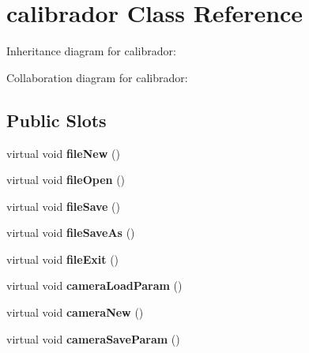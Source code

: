 \hypertarget{classcalibrador}{}\section{calibrador Class Reference}
\label{classcalibrador}


Inheritance diagram for calibrador\+:


Collaboration diagram for calibrador\+:
\subsection*{Public Slots}
\begin{DoxyCompactItemize}
\item 
virtual void {\bfseries file\+New} ()\hypertarget{classcalibrador_acc61eac7bc3b9f12d98f72a5f029d8b8}{}\label{classcalibrador_acc61eac7bc3b9f12d98f72a5f029d8b8}

\item 
virtual void {\bfseries file\+Open} ()\hypertarget{classcalibrador_a69fa0dd808698792a75f7294f2109c18}{}\label{classcalibrador_a69fa0dd808698792a75f7294f2109c18}

\item 
virtual void {\bfseries file\+Save} ()\hypertarget{classcalibrador_a9a625add9f1fe1314fa4fead802a69d5}{}\label{classcalibrador_a9a625add9f1fe1314fa4fead802a69d5}

\item 
virtual void {\bfseries file\+Save\+As} ()\hypertarget{classcalibrador_aed2fe336e0cff3d03bf0716c8e2b655c}{}\label{classcalibrador_aed2fe336e0cff3d03bf0716c8e2b655c}

\item 
virtual void {\bfseries file\+Exit} ()\hypertarget{classcalibrador_a99e69e2a5ceeb0aee5d4bcf1855b7fdf}{}\label{classcalibrador_a99e69e2a5ceeb0aee5d4bcf1855b7fdf}

\item 
virtual void {\bfseries camera\+Load\+Param} ()\hypertarget{classcalibrador_add25061e8da4c8492ed7ffa6fe63c312}{}\label{classcalibrador_add25061e8da4c8492ed7ffa6fe63c312}

\item 
virtual void {\bfseries camera\+New} ()\hypertarget{classcalibrador_a2b0635e40f31a88cd831eb81fd8dc170}{}\label{classcalibrador_a2b0635e40f31a88cd831eb81fd8dc170}

\item 
virtual void {\bfseries camera\+Save\+Param} ()\hypertarget{classcalibrador_a4682d632543fd74e681cdf7b36fb0b9e}{}\label{classcalibrador_a4682d632543fd74e681cdf7b36fb0b9e}


\end{DoxyCompactItemize}
